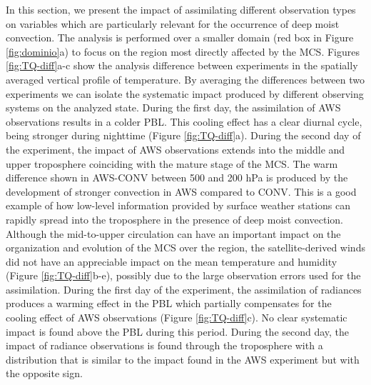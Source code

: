 \documentclass[final,5p,times,twocolumn,authoryear]{elsarticle} %
\begin{document}
In this section, we present the impact of assimilating different observation types on variables which are particularly relevant for the occurrence of deep moist convection. The analysis is performed over a smaller domain (red box in Figure \ref{fig:dominio}a) to focus on the region most directly affected by the MCS. Figures \ref{fig:TQ-diff}a-c show the analysis difference between experiments in the spatially averaged vertical profile of temperature. By averaging the differences between two experiments we can isolate the systematic impact produced by different observing systems on the analyzed state. During the first day, the assimilation of AWS observations results in a colder PBL. This cooling effect has a clear diurnal cycle, being stronger during nighttime (Figure \ref{fig:TQ-diff}a). During the second day of the experiment, the impact of AWS observations extends into the middle and upper troposphere coinciding with the mature stage of the MCS. The warm difference shown in AWS-CONV between 500 and 200 hPa is produced by the development of stronger convection in AWS compared to CONV. This is a good example of how low-level information provided by surface weather stations can rapidly spread into the troposphere in the presence of deep moist convection. Although the mid-to-upper circulation can have an important impact on the organization and evolution of the MCS over the region, the satellite-derived winds did not have an appreciable impact on the mean temperature and humidity (Figure \ref{fig:TQ-diff}b-e), possibly due to the large observation errors used for the assimilation.
During the first day of the experiment, the assimilation of radiances produces a warming effect in the PBL which partially compensates for the cooling effect of AWS observations (Figure \ref{fig:TQ-diff}c). No clear systematic impact is found above the PBL during this period. During the second day, the impact of radiance observations is found through the troposphere with a distribution that is similar to the impact found in the AWS experiment but with the opposite sign.
\end{document}
